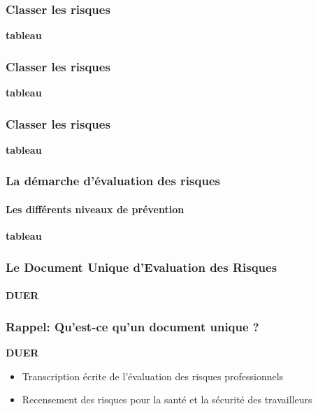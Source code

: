 \documentclass{beamer}
\begin{document}
\begin{frame}
\frametitle{Classer les risques}

\textbf{tableau}
\end{frame}

\begin{frame}
\frametitle{Classer les risques}

\textbf{tableau}
\end{frame}

\begin{frame}
\frametitle{Classer les risques}

\textbf{tableau}
\end{frame}

\begin{frame}
\frametitle{La démarche d’évaluation des risques}
\framesubtitle{Les différents niveaux de prévention}
\textbf{tableau}
\end{frame}

\begin{frame}
\frametitle{Le Document Unique d’Evaluation des Risques}
\framesubtitle{DUER}
\end{frame}

\begin{frame}
\frametitle{Rappel: Qu’est-ce qu’un document unique ?}

\textbf{DUER}
\begin{itemize}
\item Transcription écrite de l’évaluation des risques professionnels

\item Recensement des risques pour la santé et la sécurité des travailleurs
\end{itemize}
\end{frame}
\end{document}
